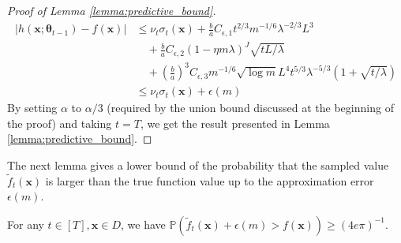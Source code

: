 \begin{proof}[Proof of Lemma \ref{lemma:predictive_bound}]
\begin{equation*}
    \begin{split}
        \lvert h(\mathbf{x}; \boldsymbol{\theta}_{t-1}) - f(\mathbf{x}) \rvert & \leq \nu_t \sigma_t (\mathbf{x}) + \frac{b}{a} C_{\epsilon,1} t^{2/3}m^{-1/6} \lambda^{-2/3} L^3 \\ &
        \quad + \frac{b}{a} C_{\epsilon,2}(1 - \eta m \lambda)^J \sqrt{tL/\lambda} \\ &
        \quad +  \left(\frac{b}{a} \right)^3 C_{\epsilon,3} m^{-1/6} \sqrt{\log m} L^4 t^{5/3} \lambda ^{-5/3} \left(1 + \sqrt{t/\lambda}  \right) \\
        & \leq \nu_t \sigma_t (\mathbf{x}) + \epsilon(m)
    \end{split}
\end{equation*}
By setting $\alpha $ to $\alpha/3$ (required by the union bound discussed at the beginning of the proof) and taking $t=T$, we get the result presented in Lemma \ref{lemma:predictive_bound}.
\end{proof}

The next lemma gives a lower bound of the probability that the sampled value $\widetilde{f}_t (\mathbf{x})$ is larger than the true function value up to the approximation error $\epsilon(m)$.
\begin{lemma}
\label{lemma:sampled_value_vs_real_value}
For any $t \in [T], \mathbf{x} \in D$, we have $\mathbb{P}(\widetilde{f}_t (\mathbf{x}) + \epsilon(m) > f(\mathbf{x})) \geq (4e\pi)^{-1}$.
\end{lemma}

